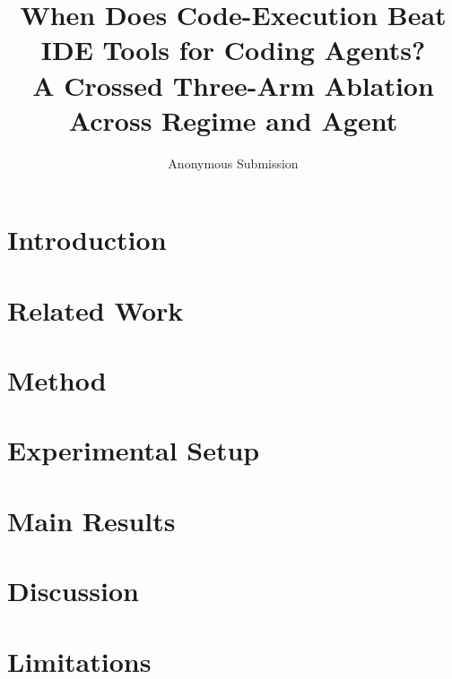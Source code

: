 \documentclass[sigconf,anonymous,review]{acmart}
\title{When Does Code-Execution Beat IDE Tools for Coding Agents?\\
  A Crossed Three-Arm Ablation Across Regime and Agent}
\author{Anonymous Submission}
\affiliation{\institution{Anonymous}\country{}}
\begin{document}
\begin{abstract}

\end{abstract}

\maketitle

\section{Introduction}
\label{sec:intro}


\section{Related Work}
\label{sec:related}


\section{Method}
\label{sec:method}


\section{Experimental Setup}
\label{sec:setup}


\section{Main Results}
\label{sec:results}


\section{Discussion}
\label{sec:discussion}


\section*{Limitations}





\end{document}
